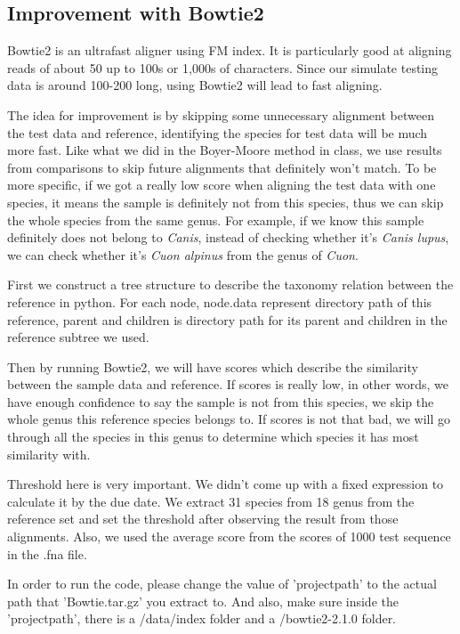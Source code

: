 \documentclass[12pt]{article} %
\begin{document}
\subsection{Improvement with Bowtie2}
Bowtie2 is an ultrafast aligner using FM index. It is particularly good at aligning reads of about 50 up to 100s or 1,000s of characters. Since our simulate testing data is around 100-200 long, using Bowtie2 will lead to fast aligning.
\par
The idea for improvement is by skipping some unnecessary alignment between the test data and reference, identifying the species for test data will be much more fast. Like what we did in the Boyer-Moore method in class, we use results from comparisons to skip future alignments that definitely won't match. To be more specific,  if we got a really low score when aligning the test data with one species, it means the sample is definitely not from this species, thus we can skip the whole species from the same genus. For example, if we know this sample definitely does not belong to \emph{Canis}, instead of checking whether it's \emph{Canis lupus}, we can check whether it's \emph{Cuon alpinus} from the genus of \emph{Cuon}.
\par
First we construct a tree structure to describe the taxonomy relation between the reference in python. For each node, node.data represent directory path of this reference, parent and children is directory path for its parent and children in the reference subtree we used. 
\par
Then by running Bowtie2, we will have scores which describe the similarity between the sample data and reference. If scores is really low, in other words, we have enough confidence to say the sample is not from this species, we skip the whole genus this reference species belongs to. If scores is not that bad, we will go through all the species in this genus to determine which species it has most similarity with.  
\par
Threshold here is very important. We didn't come up with a fixed expression to calculate it by the due date. We extract 31 species from 18 genus from the reference set and set the threshold after observing the result from those alignments. Also, we used the average score from the scores of 1000 test sequence in the .fna file.
\par
In order to run the code, please change the value of 'projectpath' to the actual path that 'Bowtie.tar.gz' you extract to. And also, make sure inside the 'projectpath', there is a /data/index folder and a /bowtie2-2.1.0 folder.
\end{document}
